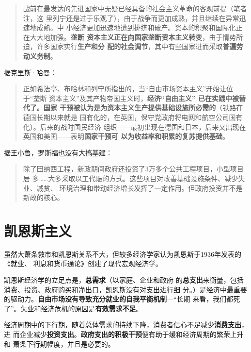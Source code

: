 \begin{enumerate}
\begin{quotation}
    战前在最发达的先进国家中无疑已经具备的社会主义革命的客观前提（笔者注，这
    里列宁还是过于乐观了），由于战争而更加成熟，并且继续在异常迅速地成熟。中
    小经济更加迅速地遭到排挤和破产。资本的积聚和国际化正在大大地加强。\textbf{垄断
      资本主义正在向国家垄断资本主义转变}，由于情势所迫，许多国家实行\textbf{生产和分
    配的社会调节}，其中有些国家进而采取\textbf{普遍劳动义务制}。
  \end{quotation}

  据克里斯·哈曼：
  \begin{quotation}
    正如希法亭、布哈林和列宁所指出的，当“自由市场资本主义”开始让位于“垄断
    资本主义”及其产物帝国主义时，\textbf{经济“自由主义” 已在实践中被替代了。国家
      干预被认为是为资本主义生产提供基础设施所必需的}（铁路在德国长期以来就是
    国有化的，在英国，保守党政府将电网和航空公司国有化）。后来的战时国民经济
    组织——最初出现在德国和日本，后来又出现在英国和美国——表明\textbf{国家干预可
      以为收益率和积累的复苏提供基础}。
  \end{quotation}

  据王小鲁，罗斯福也没有大搞基建：
  \begin{quotation}
    除了田纳西工程，新政期间政府还投资了3万多个公共工程项目，小型项目居
    多……大多采取以工代赈的方式。这些项目对改善基础设施条件、减少失业、减贫、
    环境治理和带动经济增长发挥了一定作用。但政府投资并不是新政的核心。
  \end{quotation}

\end{enumerate}

\section{凯恩斯主义}

虽然大萧条救市和凯恩斯关系不大，但较多经济学家认为凯恩斯于1936年发表的《就业、
利息和货币通论》创建了现代宏观经济学。

凯恩斯经济学\cite{jahan2014keynesian}的立足点是，\textbf{总需求}（以家庭、企业和政府
的\textbf{总支出}来衡量，包括消费、投资、政府购买和净出口，凯恩斯没有对支出进行细
分。）是经济中最重要的驱动力。\textbf{自由市场没有导致充分就业的自我平衡机制}---“长期
来看，我们都死了”。失业和经济危机的原因是\textbf{有效需求不足}。

经济周期中的下行期，随着总体需求的持续下降，消费者信心不足减少\textbf{消费支出}，进
而企业减少\textbf{投资支出}。\textbf{政府支出的积极干预}便有助于缓和经济周期的繁荣上升和
萧条下行期幅度，并且是必要的。

